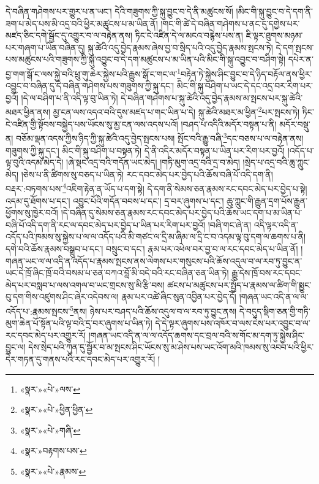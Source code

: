 དེ་བཞིན་གཤེགས་པར་གྱུར་པ་ན་ཡང་། དེའི་གཟུགས་ཀྱི་སྐུ་བྱུང་བ་དེ་ནི་མཚུངས་སོ། །མིང་གི་སྐུ་བྱུང་བ་དེ་དག་ནི་ཟག་པ་མེད་པས་མི་འདྲ་བའི་ཕྱིར་མཚུངས་པ་མ་ཡིན་ནོ། །གང་གི་ཚེ་དེ་བཞིན་གཤེགས་པ་ནང་དུ་དགྱེས་པར་མཛད་ཅིང་དགེ་སྦྱོང་དུ་འགྱུར་བ་ལ་བརྟེན་ནས། ཏིང་ངེ་འཛིན་དེ་ལ་མངའ་བརྙེས་པས་ན། ཇི་ལྟར་ཐུགས་མཉམ་པར་གཞག་པ་ཡིན་བཞིན་དུ། སྐུ་ཚེའི་འདུ་བྱེད་རྣམས་ཞེས་བྱ་བ་སྲིད་པའི་འདུ་བྱེད་རྣམས་སྤངས་ཏེ། དེ་དག་སྤངས་པས་མཚུངས་པའི་གཟུགས་ཀྱི་སྐུ་འབྱུང་བ་དེ་དག་མཚུངས་པ་མ་ཡིན་པའི་མིང་གི་སྐུ་འབྱུང་བ་བཤིག་སྟེ། དཔེར་ན་བྱ་གག་སྒོ་ང་ལས་སྐྱེ་བའི་ཕྲུ་གུ་ཆེར་སྐྱེས་པའི་རྒྱུས་སྒོ་ང་གང་ལ་\footnote{«སྣར་»«པེ་»ལས་}བརྟེན་ཏེ་སྐྱེས་ཤིང་བྱུང་བ་དེ་ཉིད་བརྟོལ་ནས་ཕྱིར་འབྱུང་བ་བཞིན་དུ་དེ་བཞིན་གཤེགས་པས་གཟུགས་ཀྱི་སྐུ་དང་། མིང་གི་སྐུ་བཤིག་པ་ཡང་དེ་དང་འདྲ་བར་རིག་པར་བྱའོ། །དེ་ལ་བཤིག་པ་ནི་འདི་ལྟ་བུ་ཡིན་ཏེ། དེ་བཞིན་གཤེགས་པ་སྐུ་ཚེའི་འདུ་བྱེད་རྣམས་མ་སྤངས་པར་སྐུ་ཚེའི་མཐར་ཕྱིན་ནས། མྱ་ངན་ལས་འདའ་བའི་དུས་མཛད་པ་གང་ཡིན་པ་དེ། སྐུ་ཚེའི་མཐར་མ་ཕྱིན་\footnote{«སྣར་»«པེ་»ཕྱིན་ཕྱིན་}པར་སྤངས་ཏེ། ཏིང་ངེ་འཛིན་གྱི་སྟོབས་བསྐྱེད་པས་ཡོངས་སུ་མྱ་ངན་ལས་འདས་པའོ། །བཤད་པ་འདིའི་མདོར་བསྟན་པ་ནི། མདོར་བསྡུ་ན། བཅོམ་ལྡན་འདས་ཀྱིས་ཉིད་ཀྱི་སྐུ་ཚེའི་འདུ་བྱེད་སྤངས་པས། སྤོང་བའི་རྒྱུ་བཞི་\footnote{«སྣར་»«པེ་»གཞི་}དང་བཅས་པ་ལ་བརྟེན་ནས། གཟུགས་ཀྱི་སྐུ་དང་། མིང་གི་སྐུ་བཤིག་པ་བསྟན་ཏེ། དེ་ནི་འདིར་མདོར་བསྟན་པ་ཡིན་པར་རིག་པར་བྱའོ། །འདོད་པ་ལྟ་བུའི་འདམ་མེད་དེ། །ཞེ་སྡང་འདྲ་བའི་གདོན་ཡང་མེད། །གཏི་མུག་འདྲ་བའི་དྲ་བ་མེད། །སྲེད་པ་འདྲ་བའི་ཆུ་ཀླུང་མེད། །ཅེས་པ་ནི་ཚིགས་སུ་བཅད་པ་ཡིན་ཏེ། རང་དབང་མེད་པར་བྱེད་པའི་ཆོས་བཞི་པོ་འདི་དག་ནི། བརྡར་:བཏགས་པས་\footnote{«སྣར་»བརྟགས་པས་}འཇིག་རྟེན་ན་ཡོད་པ་དག་སྟེ། དེ་དག་ནི་སེམས་ཅན་རྣམས་རང་དབང་མེད་པར་བྱེད་པ་སྟེ། འདམ་དུ་ཐོགས་པ་དང་། འབྱུང་པོའི་གདོན་བབས་པ་དང་། དྲ་བར་ཞུགས་པ་དང་། ཆུ་ཀླུང་གི་རྒྱུན་དྲག་པོས་རྒྱུན་ཕྱོགས་སུ་ཁྱེར་བའོ། །དེ་བཞིན་དུ་སེམས་ཅན་རྣམས་རང་དབང་མེད་པར་བྱེད་པའི་ཆོས་ཡང་དག་པ་མ་ཡིན་པ་བཞི་པོ་འདི་དག་ནི་རང་ལ་དབང་མེད་པར་བྱེད་པ་ཡིན་པར་རིག་པར་བྱའོ། །བཞི་གང་ཞེ་ན། འདི་ལྟར་འདི་ན་འདོད་པའི་ཁམས་སུ་སྐྱེས་པ་ལ་ལ་འདོད་པའི་མི་གཙང་ལ་དྲི་མ་ཞིམ་ལ་དྲི་ང་བ་འདམ་ལྟ་བུ་དག་ལ་ཆགས་པ་ནི། དགེ་བའི་ཆོས་རྣམས་བསྒྲུབ་པ་དང་། བསྲུང་བ་དང་། རྣམ་པར་འཕེལ་བར་བྱ་བ་ལ་རང་དབང་མེད་པ་ཡིན་ནོ། །གཞན་ཡང་ལ་ལ་འདི་ན་འདོད་པ་རྣམས་སྤངས་ནས་ལེགས་པར་གསུངས་པའི་ཆོས་འདུལ་བ་ལ་རབ་ཏུ་བྱུང་ན་ཡང་དེ་ཁྲོ་ཞིང་ཁྲོ་བའི་བསམ་པ་ཅན་བཀའ་བློ་མི་བདེ་བའི་རང་བཞིན་ཅན་ཡིན་ཏེ། རྒྱུ་དེས་ཁྲོ་བས་རང་དབང་མེད་པར་བསླབ་པ་ལས་འགལ་བ་ཡང་གྲངས་སུ་མི་རྩི་བས། ཚངས་པ་མཚུངས་པར་སྤྱོད་པ་རྣམས་ལ་ཚིག་གི་སྨྱུང་བུ་དག་གིས་འཛུགས་ཤིང་ཞེར་འདེབས་ལ། རྣམ་པར་འཚེ་ཞིང་སུན་འབྱིན་པར་བྱེད་དོ། །གཞན་ཡང་འདི་ན་ལ་ལ་འདོད་པ་:རྣམས་སྤངས་\footnote{«སྣར་»«པེ་»རྣམས་}ནས། ཉེས་པར་བཤད་པའི་ཆོས་འདུལ་བ་ལ་རབ་ཏུ་བྱུང་ནས། དེ་བདུད་སྡིག་ཅན་གྱི་གཏི་མུག་ཆེན་པོ་སྟོན་པའི་ལྟ་བའི་དྲ་བར་ཞུགས་པ་ཡིན་ཏེ། དེ་དེ་ལྟར་ཞུགས་པས་འཁོར་བ་ལས་ངེས་པར་འབྱུང་བ་ལ་རང་དབང་མེད་པར་འགྱུར་རོ། །གཞན་ཡང་འདི་ན་ལ་ལ་འདོད་ཆགས་དང་བྲལ་བའི་ས་གོང་མ་དག་ཏུ་སྐྱེས་ཤིང་བྱུང་ལ། དེས་སྲེད་པའི་ཀུན་དུ་སྦྱོར་བ་མ་སྤངས་ཤིང་ཡོངས་སུ་མ་ཤེས་པས་ཡང་འོག་མའི་ཁམས་སུ་འབབ་པའི་ཕྱིར་དེར་གཏན་དུ་གནས་པའི་རང་དབང་མེད་པར་འགྱུར་རོ། །

